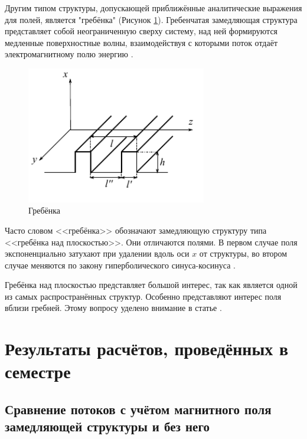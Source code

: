 \documentclass[a4paper,14pt]{extreport} %
\begin{document}
Другим типом структуры, допускающей приближённые аналитические выражения для полей, является "гребёнка" (Рисунок \ref{fig1}). Гребенчатая замедляющая структура представляет собой неограниченную сверху систему, над ней формируются медленные поверхностные волны, взаимодействуя с которыми поток отдаёт электромагнитному полю энергию \cite{Barsukov}.
\begin{figure}[ht]
	\centering
	\includegraphics[width = 0.7\textwidth]{images/pdf/comb-type_structure_without.pdf}
	\caption{Гребёнка} \label{fig1}
\end{figure}

Часто словом <<гребёнка>>  обозначают замедляющую структуру типа <<гребёнка над плоскостью>>. Они отличаются полями. В первом случае поля экспоненциально затухают при удалении вдоль оси $x$ от структуры, во втором случае меняются по закону гиперболического синуса-косинуса \cite{Silin}.

Гребёнка над плоскостью представляет большой интерес, так как является одной из самых распространённых структур. Особенно представляют интерес поля вблизи гребней. Этому вопросу уделено внимание в статье \cite{VSTUShein3}. 

\chapter{Результаты расчётов, проведённых в семестре}

\section{Сравнение потоков с учётом магнитного поля замедляющей \mbox{структуры} и без него}
\end{document}
